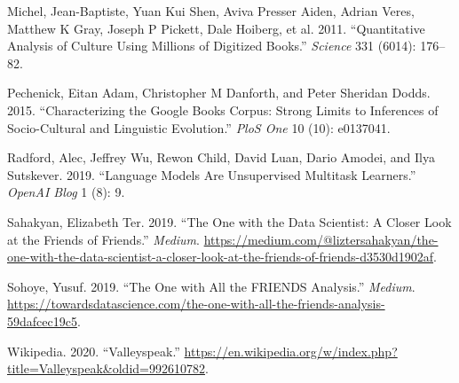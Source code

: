 \documentclass[]{article}
\begin{document}
\leavevmode\hypertarget{ref-michel2011quantitative}{}%
Michel, Jean-Baptiste, Yuan Kui Shen, Aviva Presser Aiden, Adrian Veres, Matthew K Gray, Joseph P Pickett, Dale Hoiberg, et al. 2011. ``Quantitative Analysis of Culture Using Millions of Digitized Books.'' \emph{Science} 331 (6014): 176--82.

\leavevmode\hypertarget{ref-pechenick2015characterizing}{}%
Pechenick, Eitan Adam, Christopher M Danforth, and Peter Sheridan Dodds. 2015. ``Characterizing the Google Books Corpus: Strong Limits to Inferences of Socio-Cultural and Linguistic Evolution.'' \emph{PloS One} 10 (10): e0137041.

\leavevmode\hypertarget{ref-radford2019language}{}%
Radford, Alec, Jeffrey Wu, Rewon Child, David Luan, Dario Amodei, and Ilya Sutskever. 2019. ``Language Models Are Unsupervised Multitask Learners.'' \emph{OpenAI Blog} 1 (8): 9.

\leavevmode\hypertarget{ref-sahakyan_one_2019}{}%
Sahakyan, Elizabeth Ter. 2019. ``The One with the Data Scientist: A Closer Look at the Friends of Friends.'' \emph{Medium}. \url{https://medium.com/@liztersahakyan/the-one-with-the-data-scientist-a-closer-look-at-the-friends-of-friends-d3530d1902af}.

\leavevmode\hypertarget{ref-sohoye_one_2019}{}%
Sohoye, Yusuf. 2019. ``The One with All the FRIENDS Analysis.'' \emph{Medium}. \url{https://towardsdatascience.com/the-one-with-all-the-friends-analysis-59dafcec19c5}.

\leavevmode\hypertarget{ref-noauthor_valleyspeak_2020}{}%
Wikipedia. 2020. ``Valleyspeak.'' \url{https://en.wikipedia.org/w/index.php?title=Valleyspeak\&oldid=992610782}.
\end{document}
